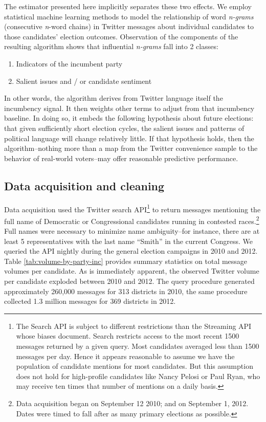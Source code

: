 \documentclass{article}
\begin{document}
The estimator presented here implicitly separates these two
effects. We employ statistical machine learning methods to model the
relationship of word \textit{n-grams} (consecutive \textit{n}-word
chains) in Twitter messages about
individual candidates to those candidates' election outcomes. Observation of the
components of the resulting algorithm shows that influential \textit{n-grams}
fall into 2 classes:

\begin{enumerate}
\item Indicators of the incumbent party
\item Salient issues and / or candidate sentiment
\end{enumerate}

In other words, the algorithm derives from Twitter language itself the
incumbency signal. It then weights other terms to adjust from that
incumbency baseline. In doing so, it embeds the following hypothesis
about future elections: that given sufficiently short election cycles,
the salient issues and patterns of political language will change
relatively little. If that hypothesis holds, then the
algorithm--nothing more than a map from the Twitter convenience sample
to the behavior of real-world voters--may offer reasonable predictive
performance.

\subsection{Data acquisition and cleaning}
\label{sec:data-acquisition}

Data acquisition used the Twitter search API\footnote{The Search API
  is subject to different restrictions than the Streaming API whose
  biases \cite{morstatter2013sample} document. Search restricts access
to the most recent 1500 messages returned by a given query. Most
candidates averaged less than 1500 messages per day. Hence it appears
reasonable to assume we have the population of candidate mentions for
most candidates. But this assumption does not hold for high-profile
candidates like Nancy Pelosi or Paul Ryan, who may receive ten times
that number of mentions on a daily basis.} to return messages
mentioning the full name of Democratic or Congressional candidates
running in contested races.\footnote{Data acquisition began on September 12
2010; and on September 1, 2012. Dates were timed to fall after as many
primary elections as possible.} Full names were necessary to minimize
name ambiguity--for instance, there are at least 5 representatives
with the last name ``Smith'' in the current Congress. We queried the API nightly during the
general election campaigns in 2010 and 2012. Table
\ref{tab:volume-by-party-inc} provides summary statistics on total
message volumes per candidate. As is immediately apparent, the observed
Twitter volume per candidate exploded between 2010 and 2012. The query
procedure generated approximately 260,000 messages for 313 districts
in 2010, the same procedure collected 1.3 million messages for 369
districts in 2012.  %
\end{document}
